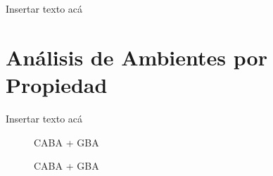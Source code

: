 \documentclass[a4paper, 10pt]{article}
\begin{document}
			\FloatBarrier
				
			Insertar texto acá			
		
		\section{Análisis de Ambientes por Propiedad}
				
			Insertar texto acá				
				
				\begin{figure}
    				\centering
    				\caption{CABA + GBA}
				\end{figure}
				
				\begin{figure}
    				\centering
    				\caption{CABA + GBA}
				\end{figure}
\end{document}

